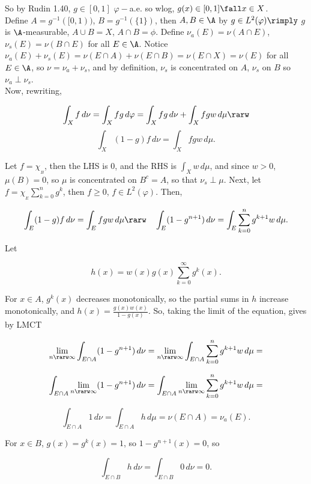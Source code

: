 \noindent
So by Rudin 1.40, $g \in [0,1]$ $\varphi-$a.e. so wlog, $g(x) \in [0,1] \fall x \in X$. \\

\noindent
Define $A = g^{-1} ([0,1))$, $B = g^{-1}( \{ 1 \})$, then $A,B \in \A$ by $g \in L^2(\varphi) \rimply$ $g$ is $\A$-measurable, $A \cup B = X$, $A \cap B = \phi$. Define $\nu_a(E) = \nu(A \cap E)$, $\nu_s(E) = \nu(B \cap E)$ for all $E \in \A$. Notice $\nu_a(E) + \nu_s(E) = \nu(E \cap A) + \nu(E \cap B) = \nu(E \cap X) = \nu(E)$ for all $E \in \A$, so $\nu = \nu_a +\nu_s$, and by definition, $\nu_s$ is concentrated on $A$, $\nu_s$ on $B$ so $\nu_a \perp \nu_s$. \\


\noindent
Now, rewriting,

$$
\int_X f \, d\nu = \int_X fg \, d\varphi =  \int_X  fg \, d\nu  +  \int_X  fgw \, d\mu \rarw 
$$
$$
 \int_X (1-g) f \, d\nu = \int_X fgw \, d\mu.
$$

\noindent

Let $f = \chi_{_B}$, then the LHS is $0$, and the RHS is $\int_X w \, d\mu$, and since $w > 0$, $\mu(B) = 0$, so $\mu$ is concentrated on $B^c = A$, so that $\nu_s \perp \mu$. Next, let $ f = \chi_{_E}  \sum_{k=0}^n g^k$, then $f \ge 0$, $f \in L^2(\varphi)$. Then,

$$
    \int_E (1-g) f \, d\nu = \int_E fgw \, d\mu \rarw \hspace{10pt} \int_E (1-g^{n+1}) \, d\nu = \int_E \sum_{k=0}^n g^{k+1} w \, d\mu.
$$

\noindent Let 

$$
h(x) = w(x)  g(x)\sum_{k=0}^\infty g^{k}(x).
$$

\noindent 
For $x \in A$, $g^k(x)$ decreases monotonically, so the partial sums in $h$ increase monotonically, and $ h(x) = \frac{g(x) w(x)}{1-g(x)}$. So, taking the limit of the equation, gives by LMCT 

$$
\lim_{n \rarw \infty}  \int_{E \cap A} (1-g^{n+1}) \, d\nu =  \lim_{n \rarw \infty}  \int_{E \cap A} \sum_{k=0}^n g^{k+1} w \, d\mu =
$$

$$
\int_{E \cap A}  \lim_{n \rarw \infty}  (1-g^{n+1}) \, d\nu =  \int_{E \cap A} \lim_{n \rarw \infty}   \sum_{k=0}^n g^{k+1} w \, d\mu =
$$

$$
\int_{E \cap A} 1 \, d\nu =  \int_{E \cap A} h \, d\mu = \nu(E \cap A) = \nu_a(E).
$$


\noindent 
For $x \in B$, $g(x) = g^k(x) = 1$, so $1-g^{n+1}(x) = 0$, so

$$
\int_{E \cap B} h \, d\nu = \int_{E \cap B} 0 \, d\nu = 0.
$$

